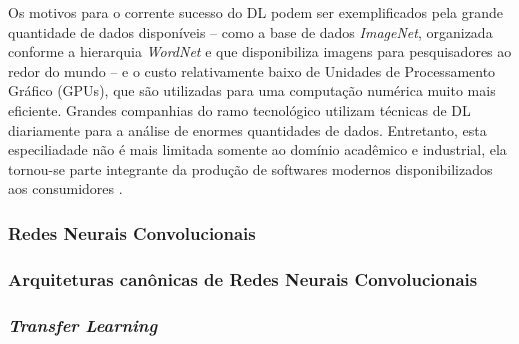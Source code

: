 Os motivos para o corrente sucesso do DL podem ser exemplificados pela grande quantidade de dados disponíveis -- como a base de dados \emph{ImageNet}, organizada conforme a hierarquia \emph{WordNet} e que disponibiliza imagens para pesquisadores ao redor do mundo \cite{imagenet} -- e o custo relativamente baixo de Unidades de Processamento Gráfico (GPUs), que são utilizadas para uma computação numérica muito mais eficiente. Grandes companhias do ramo tecnológico utilizam técnicas de DL diariamente para a análise de enormes quantidades de dados. Entretanto, esta especiliadade não é mais limitada somente ao domínio acadêmico e industrial, ela tornou-se parte integrante da produção de softwares modernos disponibilizados aos consumidores \cite{gulli}.


\subsubsection{Redes Neurais Convolucionais}
\label{subsubsec:cnns}



\subsubsection{Arquiteturas canônicas de Redes Neurais Convolucionais}
\label{subsubsec:arq-cnns}

\subsubsection{\emph{Transfer Learning}}
\label{subsubsec:transfer}
